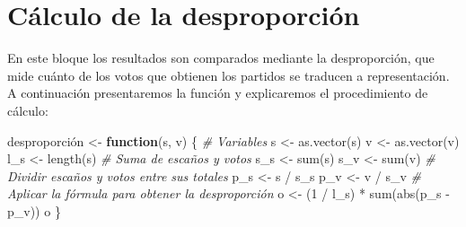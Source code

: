 \documentclass[12pt,a4paper,]{book}
\newenvironment{Shaded}{\begin{snugshade}}{\end{snugshade}}
\newcommand{\CommentTok}[1]{\textcolor[rgb]{0.56,0.35,0.01}{\textit{#1}}}
\newcommand{\ControlFlowTok}[1]{\textcolor[rgb]{0.13,0.29,0.53}{\textbf{#1}}}
\newcommand{\DecValTok}[1]{\textcolor[rgb]{0.00,0.00,0.81}{#1}}
\newcommand{\FunctionTok}[1]{\textcolor[rgb]{0.00,0.00,0.00}{#1}}
\newcommand{\NormalTok}[1]{#1}
\newcommand{\OtherTok}[1]{\textcolor[rgb]{0.56,0.35,0.01}{#1}}
\newcommand{\SpecialCharTok}[1]{\textcolor[rgb]{0.00,0.00,0.00}{#1}}
\numberwithin{dummy}{section}
\theoremstyle{ocrenumbox}
\theoremstyle{blacknumex}
\theoremstyle{blacknumbox}
\theoremstyle{ocrenum}
\theoremstyle{ocrenum}
\begin{document}
\hypertarget{cuxe1lculo-de-la-desproporciuxf3n}{%
\section{Cálculo de la
desproporción}\label{cuxe1lculo-de-la-desproporciuxf3n}}

En este bloque los resultados son comparados mediante la desproporción,
que mide cuánto de los votos que obtienen los partidos se traducen a
representación. A continuación presentaremos la función y explicaremos
el procedimiento de cálculo:

\begin{Shaded}
\begin{Highlighting}[]
\NormalTok{desproporción }\OtherTok{\textless{}{-}}
  \ControlFlowTok{function}\NormalTok{(s, v) \{  }\CommentTok{\# Variables}
\NormalTok{    s }\OtherTok{\textless{}{-}} \FunctionTok{as.vector}\NormalTok{(s)}
\NormalTok{    v }\OtherTok{\textless{}{-}} \FunctionTok{as.vector}\NormalTok{(v)}
\NormalTok{    l\_s }\OtherTok{\textless{}{-}} \FunctionTok{length}\NormalTok{(s)}
    \CommentTok{\# Suma de escaños y votos}
\NormalTok{    s\_s }\OtherTok{\textless{}{-}} \FunctionTok{sum}\NormalTok{(s)   }
\NormalTok{    s\_v }\OtherTok{\textless{}{-}} \FunctionTok{sum}\NormalTok{(v)}
    \CommentTok{\# Dividir escaños y votos entre sus totales}
\NormalTok{    p\_s }\OtherTok{\textless{}{-}}\NormalTok{ s }\SpecialCharTok{/}\NormalTok{ s\_s}
\NormalTok{    p\_v }\OtherTok{\textless{}{-}}\NormalTok{ v }\SpecialCharTok{/}\NormalTok{ s\_v}
    \CommentTok{\# Aplicar la fórmula para obtener la desproporción}
\NormalTok{    o }\OtherTok{\textless{}{-}}\NormalTok{ (}\DecValTok{1} \SpecialCharTok{/}\NormalTok{ l\_s) }\SpecialCharTok{*} \FunctionTok{sum}\NormalTok{(}\FunctionTok{abs}\NormalTok{(p\_s }\SpecialCharTok{{-}}\NormalTok{ p\_v))}
\NormalTok{    o}
\NormalTok{  \}}
\end{Highlighting}
\end{Shaded}
\end{document}
